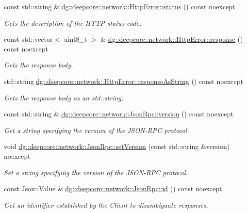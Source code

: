 \begin{DoxyCompactItemize}
const std\+::string \& \hyperlink{group___network_module_gadaf5c8fe0e843d50fa5f55a83f6bb0d6}{dg\+::deepcore\+::network\+::\+Http\+Error\+::status} () const noexcept
\begin{DoxyCompactList}\small\item\em Gets the description of the H\+T\+TP status code. \end{DoxyCompactList}\item 
const std\+::vector$<$ uint8\+\_\+t $>$ \& \hyperlink{group___network_module_gac1cbcd7696b0048a61231953d2aad0d7}{dg\+::deepcore\+::network\+::\+Http\+Error\+::response} () const noexcept
\begin{DoxyCompactList}\small\item\em Gets the response body. \end{DoxyCompactList}\item 
std\+::string \hyperlink{group___network_module_ga0768820112e9c0d089a04b9d98bb5bf2}{dg\+::deepcore\+::network\+::\+Http\+Error\+::response\+As\+String} () const noexcept
\begin{DoxyCompactList}\small\item\em Gets the response body as an std\+::string. \end{DoxyCompactList}\item 
const std\+::string \& \hyperlink{group___network_module_ga57b18a1db26df83b5d1769b6101ee67f}{dg\+::deepcore\+::network\+::\+Json\+Rpc\+::version} () const noexcept
\begin{DoxyCompactList}\small\item\em Get a string specifying the version of the J\+S\+O\+N-\/\+R\+PC protocol. \end{DoxyCompactList}\item 
void \hyperlink{group___network_module_ga7bfca4f17a0916e6f1313b04496b9e0d}{dg\+::deepcore\+::network\+::\+Json\+Rpc\+::set\+Version} (const std\+::string \&version) noexcept
\begin{DoxyCompactList}\small\item\em Set a string specifying the version of the J\+S\+O\+N-\/\+R\+PC protocol. \end{DoxyCompactList}\item 
const Json\+::\+Value \& \hyperlink{group___network_module_ga76f1d35ffeff40b5df1874c68b97c89a}{dg\+::deepcore\+::network\+::\+Json\+Rpc\+::id} () const noexcept
\begin{DoxyCompactList}\small\item\em Get an identifier established by the Client to disambiguate responses. \end{DoxyCompactList}\item 

\end{DoxyCompactItemize}
